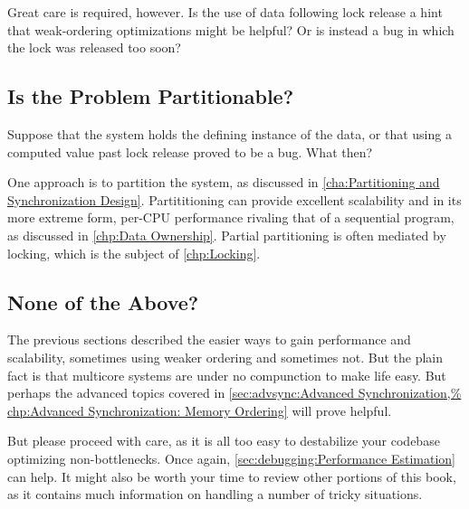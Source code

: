 Great care is required, however.
Is the use of data following lock release a hint that weak-ordering
optimizations might be helpful?
Or is instead a bug in which the lock was released too soon?

\fi

\subsection{Is the Problem Partitionable?}
\label{sec:app:questions:Is the Problem Partitionable?}

Suppose that the system holds the defining instance of the data,
or that using a computed value past lock release proved to be a bug.
What then?

One approach is to partition the system, as discussed in
\cref{cha:Partitioning and Synchronization Design}.
Partititioning can provide excellent scalability and in its more
extreme form, per-CPU performance rivaling that of a sequential program,
as discussed in \cref{chp:Data Ownership}.
Partial partitioning is often mediated by locking, which is the subject of
\cref{chp:Locking}.

\subsection{None of the Above?}
\label{sec:app:questions:None of the Above?}

The previous sections described the easier ways to gain performance
and scalability, sometimes using weaker ordering and sometimes not.
But the plain fact is that multicore systems are under no compunction
to make life easy.
But perhaps the advanced topics covered in
\cref{sec:advsync:Advanced Synchronization,%
chp:Advanced Synchronization: Memory Ordering}
will prove helpful.

But please proceed with care, as it is all too easy to destabilize
your codebase optimizing non-bottlenecks.
Once again, \cref{sec:debugging:Performance Estimation} can help.
It might also be worth your time to review other portions of this
book, as it contains much information on handling a number of tricky
situations.
